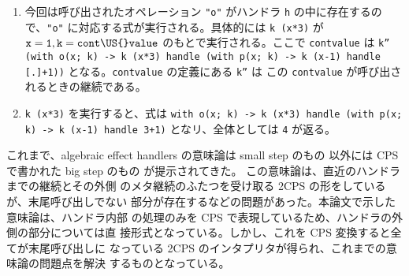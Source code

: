 \begin{enumerate}
\item
今回は呼び出されたオペレーション \texttt{"o"} がハンドラ \texttt{h} の中に存在するの
   で、\texttt{"o"} に対応する式が実行される。具体的には \texttt{k (x*3)} が $\texttt{x}=\texttt{1},
   \texttt{k}=\texttt{cont\US{}value}$ のもとで実行される。ここで \texttt{cont\US{}value} は
   \texttt{k'' (with \LBR{}o(x; k) -> k (x*3)\RBR{} handle (with \LBR{}p(x; k) -> k (x-1)\RBR{} handle [.]+1))}
   となる。\texttt{cont\US{}value} の定義にある \texttt{k''} は この \texttt{cont\US{}value} が呼び出されるときの継続である。
\item
\texttt{k (x*3)} を実行すると、式は
   \texttt{with \LBR{}o(x; k) -> k (x*3)\RBR{} handle (with \LBR{}p(x; k) -> k (x-1)\RBR{} handle 3+1)}
   となリ、全体としては \texttt{4} が返る。
\end{enumerate}

これまで、algebraic effect handlers の意味論は small step のもの
\cite{10.1145/2500365.2500590, PRETNAR201519}
以外には
CPS で書かれた big step のもの
\cite{e6cb0c3222794e48bf38cf44e46fe4aa}
が提示されてきた。
この意味論は、直近のハンドラまでの継続とその外側
のメタ継続のふたつを受け取る 2CPS の形をしているが、末尾呼び出しでない
部分が存在するなどの問題があった。本論文で示した意味論は、ハンドラ内部
の処理のみを CPS で表現しているため、ハンドラの外側の部分については直
接形式となっている。しかし、これを CPS 変換すると全てが末尾呼び出しに
なっている 2CPS のインタプリタが得られ、これまでの意味論の問題点を解決
するものとなっている。
